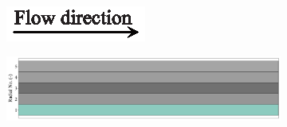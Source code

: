 \documentclass[preprint,12pt]{elsarticle}
\begin{document}
\begin{figure}
     \centering
     \begin{subfigure}[b]{\textwidth}
     	\includegraphics[width=\textwidth]{flow_dir.eps}
     \end{subfigure}
     \begin{subfigure}[b]{0.85\textwidth}
\includegraphics[width=\textwidth]{results/segments/5seg/50C50T/seg.png}
     \end{subfigure}
     \hfill
     \begin{subfigure}[b]{0.1\textwidth}

\end{subfigure}
\end{figure}
\end{document}
